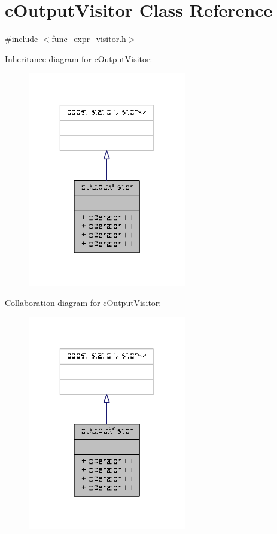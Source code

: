 \hypertarget{classcOutputVisitor}{\section{c\-Output\-Visitor Class Reference}
\label{classcOutputVisitor}
}


{\ttfamily \#include $<$func\-\_\-expr\-\_\-visitor.\-h$>$}



Inheritance diagram for c\-Output\-Visitor\-:
\nopagebreak
\begin{figure}[H]
\begin{center}
\leavevmode
\includegraphics[width=196pt]{classcOutputVisitor__inherit__graph}
\end{center}
\end{figure}


Collaboration diagram for c\-Output\-Visitor\-:
\nopagebreak
\begin{figure}[H]
\begin{center}
\leavevmode
\includegraphics[width=196pt]{classcOutputVisitor__coll__graph}
\end{center}
\end{figure}
